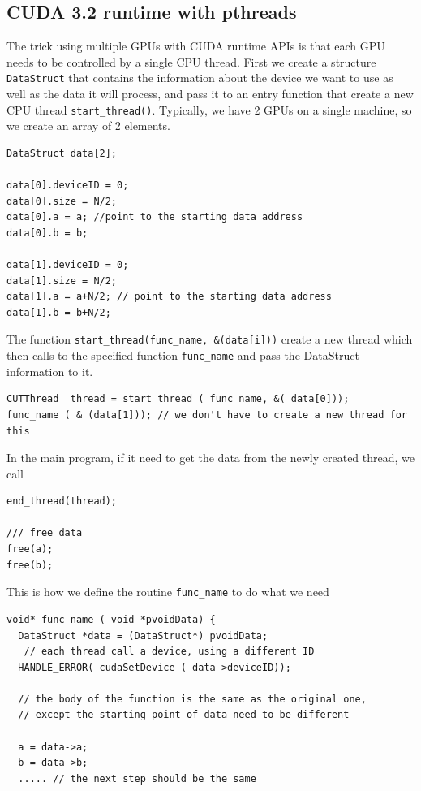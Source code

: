 \subsection{CUDA 3.2 runtime with pthreads}
\label{sec:GPUs_pthreads}


The trick using multiple GPUs with CUDA runtime APIs is that each GPU needs to
be controlled by a single CPU thread. First we create a structure
\verb!DataStruct! that contains the information about the device we want to use
as well as the data it will process, and pass it to an entry function that
create a new CPU thread \verb!start_thread()!. Typically, we have 2 GPUs on a single machine, so we create an array of 2
elements.
\begin{lstlisting}
DataStruct data[2];

data[0].deviceID = 0;
data[0].size = N/2;
data[0].a = a; //point to the starting data address
data[0].b = b;

data[1].deviceID = 0;
data[1].size = N/2;
data[1].a = a+N/2; // point to the starting data address
data[1].b = b+N/2;
\end{lstlisting}
The function \verb!start_thread(func_name, &(data[i]))! create a new thread
which then calls to the specified function \verb!func_name! and pass the
DataStruct information to it.
\begin{lstlisting}
CUTThread  thread = start_thread ( func_name, &( data[0]));
func_name ( & (data[1])); // we don't have to create a new thread for this
\end{lstlisting}
In the main program, if it need to get the data from the newly created thread,
we call
\begin{lstlisting}
end_thread(thread);

/// free data
free(a);
free(b);
\end{lstlisting}

This is how we define the routine \verb!func_name! to do what we need
\begin{lstlisting}
void* func_name ( void *pvoidData) {
  DataStruct *data = (DataStruct*) pvoidData;
   // each thread call a device, using a different ID
  HANDLE_ERROR( cudaSetDevice ( data->deviceID));
  
  // the body of the function is the same as the original one,
  // except the starting point of data need to be different
  
  a = data->a;
  b = data->b;
  ..... // the next step should be the same
  
\end{lstlisting}

